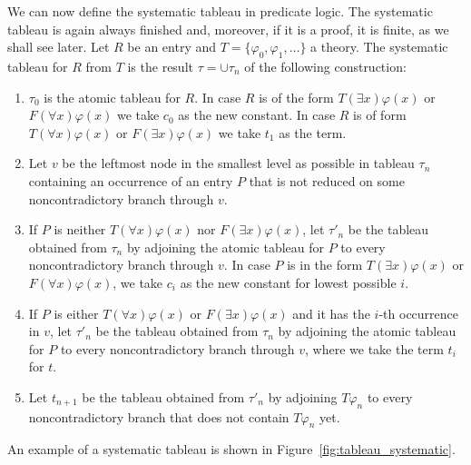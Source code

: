 We can now define the systematic tableau in predicate logic. The systematic tableau is again always finished and, moreover, if it is a proof, it is finite, as we shall see later. Let $R$ be an entry and $T=\{\varphi_0, \varphi_1, \dots\}$ a theory. The systematic tableau for $R$ from $T$ is the result $\tau = \cup \tau_n$ of the following construction:
\begin{enumerate}
  \item $\tau_0$ is the atomic tableau for $R$. In case $R$ is of the form $T(\exists x)\varphi(x)$ or $F(\forall x) \varphi(x)$ we take $c_0$ as the new constant. In case $R$ is of form $T(\forall x) \varphi(x)$ or $F(\exists x) \varphi(x)$ we take $t_1$ as the term.
  \item Let $v$ be the leftmost node in the smallest level as possible in tableau $\tau_n$ containing an occurrence of an entry $P$ that is not reduced on some noncontradictory branch through $v$.
  \item If $P$ is neither $T(\forall x)\varphi(x)$ nor $F(\exists x)\varphi(x)$, let $\tau'_n$ be the tableau obtained from $\tau_n$ by adjoining the atomic tableau for $P$ to every noncontradictory branch through $v$. In case $P$ is in the form $T(\exists x)\varphi(x)$ or $F(\forall x) \varphi(x)$, we take $c_i$ as the new constant for lowest possible $i$.
  \item If $P$ is either $T(\forall x)\varphi(x)$ or $F(\exists x)\varphi(x)$ and it has the $i$-th occurrence in $v$, let $\tau'_n$ be the tableau obtained from $\tau_n$ by adjoining the atomic tableau for $P$ to every noncontradictory branch through $v$, where we take the term $t_i$ for $t$.
  \item Let $t_{n+1}$ be the tableau obtained from $\tau'_n$ by adjoining $T \varphi_n$ to every noncontradictory branch that does not contain $T \varphi_n$ yet.
\end{enumerate}  

An example of a systematic tableau is shown in Figure~\ref{fig:tableau_systematic}.

